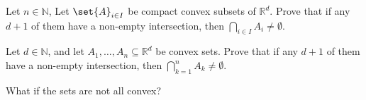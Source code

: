 Let $n \in \mathbb{N}$,
Let $\set{A}_{i \in I}$ be compact convex subsets of $\mathbb{R}^{d}$.
Prove that if any $d + 1$ of them have a non-empty intersection,
then $\bigcap\limits_{i \in I} {A_i} \neq \emptyset$.

Let $d \in \mathbb{N}$,
and let $A_1, \dotsc, A_n \subseteq \mathbb{R}^{d}$ be convex sets.
Prove that if any $d + 1$ of them have a non-empty intersection,
then $\bigcap\limits_{k = 1}^{n} {A_k} \neq \emptyset$.

What if the sets are not all convex?
